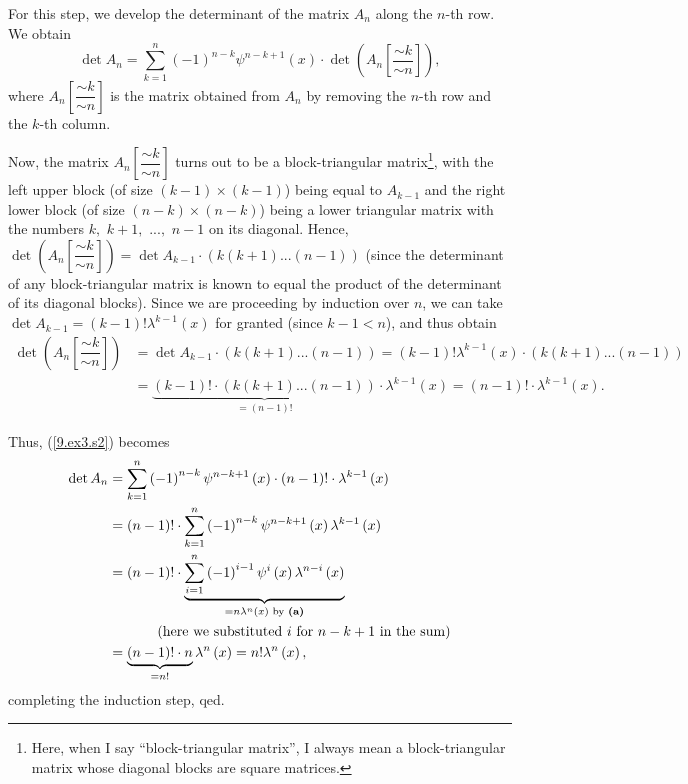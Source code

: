 \documentclass[numbers=enddot,12pt,final,onecolumn,notitlepage]{scrartcl}%
\begin{document}
For this step, we develop the determinant of the matrix $A_{n}$ along the
$n$-th row. We obtain%
\begin{equation}
\det A_{n}=\sum_{k=1}^{n}\left(  -1\right)  ^{n-k}\psi^{n-k+1}\left(
x\right)  \cdot\det\left(  A_{n}\left[  \dfrac{\sim k}{\sim n}\right]
\right)  , \label{9.ex3.s2}%
\end{equation}
where $A_{n}\left[  \dfrac{\sim k}{\sim n}\right]  $ is the matrix obtained
from $A_{n}$ by removing the $n$-th row and the $k$-th column.

Now, the matrix $A_{n}\left[  \dfrac{\sim k}{\sim n}\right]  $ turns out to be
a block-triangular matrix\footnote{Here, when I say ``block-triangular matrix'',
I always mean a block-triangular matrix whose diagonal blocks are square
matrices.}, with the left upper block (of size $\left(  k-1\right)
\times\left(  k-1\right)  $) being equal to $A_{k-1}$ and the right lower
block (of size $\left(  n-k\right)  \times\left(  n-k\right)  $) being a lower
triangular matrix with the numbers $k,$ $k+1,$ $...,$ $n-1$ on its diagonal.
Hence, $\det\left(  A_{n}\left[  \dfrac{\sim k}{\sim n}\right]  \right)  =\det
A_{k-1}\cdot\left(  k\left(  k+1\right)  ...\left(  n-1\right)  \right)  $
(since the determinant of any block-triangular matrix is known to equal the
product of the determinant of its diagonal blocks). Since we are proceeding by
induction over $n$, we can take $\det A_{k-1}=\left(  k-1\right)
!\lambda^{k-1}\left(  x\right)  $ for granted (since $k-1<n$), and thus obtain%
\begin{align*}
\det\left(  A_{n}\left[  \dfrac{\sim k}{\sim n}\right]  \right)   &  =\det
A_{k-1}\cdot\left(  k\left(  k+1\right)  ...\left(  n-1\right)  \right)
=\left(  k-1\right)  !\lambda^{k-1}\left(  x\right)  \cdot\left(  k\left(
k+1\right)  ...\left(  n-1\right)  \right) \\
&  =\underbrace{\left(  k-1\right)  !\cdot\left(  k\left(  k+1\right)
...\left(  n-1\right)  \right)  }_{=\left(  n-1\right)  !}\cdot\lambda
^{k-1}\left(  x\right)  =\left(  n-1\right)  !\cdot\lambda^{k-1}\left(
x\right)  .
\end{align*}


Thus, (\ref{9.ex3.s2}) becomes%
\begin{align*}
\det A_{n}  &  =\sum_{k=1}^{n}\left(  -1\right)  ^{n-k}\psi^{n-k+1}\left(
x\right)  \cdot\left(  n-1\right)  !\cdot\lambda^{k-1}\left(  x\right) \\
&  =\left(  n-1\right)  !\cdot\sum_{k=1}^{n}\left(  -1\right)  ^{n-k}%
\psi^{n-k+1}\left(  x\right)  \lambda^{k-1}\left(  x\right) \\
&  =\left(  n-1\right)  !\cdot\underbrace{\sum_{i=1}^{n}\left(  -1\right)
^{i-1}\psi^{i}\left(  x\right)  \lambda^{n-i}\left(  x\right)  }%
_{=n\lambda^{n}\left(  x\right)  \text{ by \textbf{(a)}}}\\
&  \ \ \ \ \ \ \ \ \ \ \left(  \text{here we substituted }i\text{ for
}n-k+1\text{ in the sum}\right) \\
&  =\underbrace{\left(  n-1\right)  !\cdot n}_{=n!}\lambda^{n}\left(
x\right)  =n!\lambda^{n}\left(  x\right)  ,
\end{align*}
completing the induction step, qed.
\end{document}
